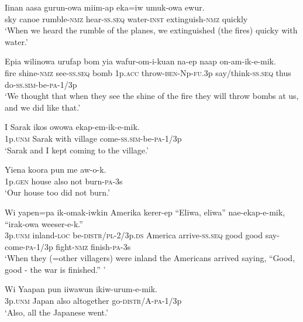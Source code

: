 \ea
\gll  Iinan  aasa  gurun-owa  miim-ap  eka=iw   umuk-owa  ewur. \\
sky  canoe  rumble-\textsc{nmz}  hear-\textsc{ss.seq}  water-\textsc{inst} extinguish-\textsc{nmz}  quickly \\


\glt ‘When we heard the rumble of the planes, we extinguished (the fires) quicky with water.’ \\
\z


\ea
\gll  Epia  wilinowa  urufap  bom  yia  wafur-om-i-kuan        na-ep  naap  on-am-ik-e-mik. \\
fire  shine-\textsc{nmz}  see-\textsc{ss.seq}  bomb  1p.\textsc{acc}  throw-\textsc{ben}-Np-\textsc{fu}.3p  say/think-\textsc{ss.seq}  thus  do{}-\textsc{ss}.\textsc{sim}-be-\textsc{pa}-1/3p \\
\glt ‘We thought that when they see the shine of the fire they will throw bombs at us, and we did like that.’ \\
\z


\ea
\gll  I  Sarak  ikos  owowa  ekap-em-ik-e-mik. \\
1p.\textsc{unm}  Sarak  with  village  come-\textsc{ss}.\textsc{sim}-be-\textsc{pa}-1/3p \\
\glt ‘Sarak and I kept coming to the village.’ \\
\z


\ea
\gll  Yiena  koora  pun  me  aw-o-k. \\
1p.\textsc{gen}  house  also  not  burn-\textsc{pa}-3s \\
\glt ‘Our house too did not burn.’ \\
\z


\ea
\gll  Wi  yapen=pa  ik-omak-iwkin  Amerika  kerer-ep             “Eliwa,  eliwa”  nae-ekap-e-mik,  “irak-owa  weeser-e-k.” \\
3p.\textsc{unm}  inland-\textsc{loc}  be-\textsc{distr}/\textsc{pl}-2/3p.\textsc{ds}  America  arrive-\textsc{ss.seq}  good  good  say-come-\textsc{pa}-1/3p  fight-\textsc{nmz}  finish-\textsc{pa}-3s \\
\glt ‘When they (=other villagers) were inland the Americans arrived saying, “Good, good - the war is finished.” ’ \\
\z


\ea
\gll  Wi  Yaapan  pun  iiwawun  ikiw-urum-e-mik. \\
3p.\textsc{unm}  Japan  also  altogether  go-\textsc{distr}/A-\textsc{pa}-1/3p \\
\glt ‘Also, all the Japanese went.’ \\
\z


